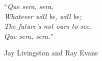 \documentclass[
11pt, %
oneside, %
ukrainian,
english, %
singlespacing, %
headsepline, %
]{BachelorMasterThesis} %
\begin{document}


 
 



\vspace*{0.2\textheight}

\begin{center}
\enquote{\itshape Que sera, sera,\\
Whatever will be, will be;\\
The future's not ours to see.\\
Que sera, sera.}

\smallskip
Jay Livingston and Ray Evans
\end{center}
\end{document}
